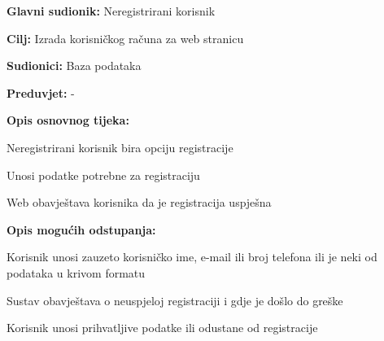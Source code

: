					\begin{packed_item}

						\item  \textbf{Glavni sudionik: } Neregistrirani korisnik
						\item  \textbf{Cilj:} Izrada korisničkog računa za web stranicu
						\item  \textbf{Sudionici:} Baza podataka
						\item  \textbf{Preduvjet:} -
						\item  \textbf{Opis osnovnog tijeka:}
						
						\item[] \begin{packed_enum}
	
							\item Neregistrirani korisnik bira opciju registracije
                            \item Unosi podatke potrebne za registraciju
							\item Web obavještava korisnika da je registracija uspješna
						\end{packed_enum}
						
						\item  \textbf{Opis mogućih odstupanja:}
						
						\item[] \begin{packed_item}
	
							\item[2.a] Korisnik unosi zauzeto korisničko ime, e-mail ili broj telefona ili je neki od podataka u krivom formatu
							\item[] \begin{packed_enum}
								
								\item Sustav obavještava o neuspjeloj registraciji i gdje je došlo do greške
								\item Korisnik unosi prihvatljive podatke ili odustane od registracije
								
							\end{packed_enum}
						\end{packed_item}
					\end{packed_item}

